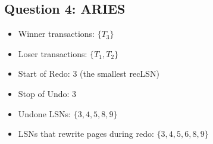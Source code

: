 \documentclass[a4paper]{article}
\begin{document}
\subsection{Question 4: ARIES}

\begin{itemize}
    \item Winner transactions: $\{T_3\}$
    \item Loser transactions: $\{T_1, T_2\}$
    \item Start of Redo: 3 (the smallest recLSN)
    \item Stop of Undo: 3
    \item Undone LSNs: $\{3, 4, 5, 8, 9\}$
    \item LSNs that rewrite pages during redo: $\{3,4,5,6,8,9\}$
\end{itemize}
\end{document}
